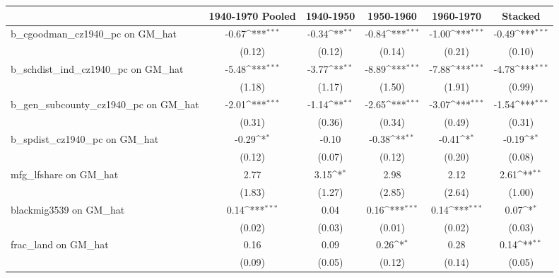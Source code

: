 {
\def\sym#1{\ifmmode^{#1}\else\(^{#1}\)\fi}
\begin{tabular}{l*{5}{c}}
\toprule
                &\multicolumn{1}{c}{1940-1970 Pooled}&\multicolumn{1}{c}{1940-1950}&\multicolumn{1}{c}{1950-1960}&\multicolumn{1}{c}{1960-1970}&\multicolumn{1}{c}{Stacked}\\
\midrule
b\_cgoodman\_cz1940\_pc on GM\_hat&    -0.67\sym{***}&    -0.34\sym{**} &    -0.84\sym{***}&    -1.00\sym{***}&    -0.49\sym{***}\\
                &   (0.12)         &   (0.12)         &   (0.14)         &   (0.21)         &   (0.10)         \\
\addlinespace
b\_schdist\_ind\_cz1940\_pc on GM\_hat&    -5.48\sym{***}&    -3.77\sym{**} &    -8.89\sym{***}&    -7.88\sym{***}&    -4.78\sym{***}\\
                &   (1.18)         &   (1.17)         &   (1.50)         &   (1.91)         &   (0.99)         \\
\addlinespace
b\_gen\_subcounty\_cz1940\_pc on GM\_hat&    -2.01\sym{***}&    -1.14\sym{**} &    -2.65\sym{***}&    -3.07\sym{***}&    -1.54\sym{***}\\
                &   (0.31)         &   (0.36)         &   (0.34)         &   (0.49)         &   (0.31)         \\
\addlinespace
b\_spdist\_cz1940\_pc on GM\_hat&    -0.29\sym{*}  &    -0.10         &    -0.38\sym{**} &    -0.41\sym{*}  &    -0.19\sym{*}  \\
                &   (0.12)         &   (0.07)         &   (0.12)         &   (0.20)         &   (0.08)         \\
\addlinespace
mfg\_lfshare on GM\_hat&     2.77         &     3.15\sym{*}  &     2.98         &     2.12         &     2.61\sym{**} \\
                &   (1.83)         &   (1.27)         &   (2.85)         &   (2.64)         &   (1.00)         \\
\addlinespace
blackmig3539 on GM\_hat&     0.14\sym{***}&     0.04         &     0.16\sym{***}&     0.14\sym{***}&     0.07\sym{*}  \\
                &   (0.02)         &   (0.03)         &   (0.01)         &   (0.02)         &   (0.03)         \\
\addlinespace
frac\_land on GM\_hat&     0.16         &     0.09         &     0.26\sym{*}  &     0.28         &     0.14\sym{**} \\
                &   (0.09)         &   (0.05)         &   (0.12)         &   (0.14)         &   (0.05)         \\

\end{tabular}}
